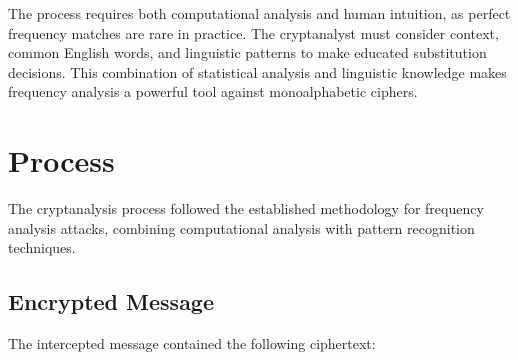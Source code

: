 \documentclass[a4paper,12pt]{article}
\begin{document}
The process requires both computational analysis and human intuition, as perfect frequency matches are rare in practice. The cryptanalyst must consider context, common English words, and linguistic patterns to make educated substitution decisions. This combination of statistical analysis and linguistic knowledge makes frequency analysis a powerful tool against monoalphabetic ciphers.
\section{Process}
\label{sec:org5408822}
The cryptanalysis process followed the established methodology for frequency analysis attacks, combining computational analysis with pattern recognition techniques.
\subsection{Encrypted Message}
\label{sec:orgb2041cd}
The intercepted message contained the following ciphertext:
\end{document}
